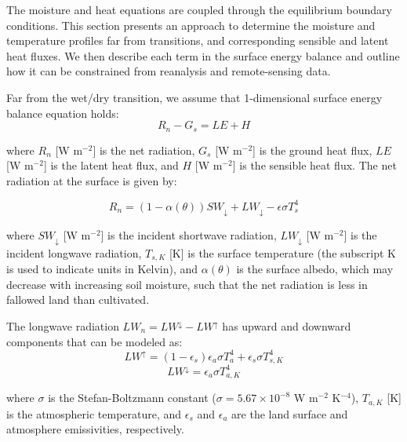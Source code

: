 \documentclass{article}
\begin{document}
    The moisture and heat equations are coupled through the equilibrium boundary conditions. 
     This section presents an approach to determine the moisture and temperature profiles far from transitions, and corresponding sensible and latent heat fluxes. 
    We then describe each term in the surface energy balance and outline how it can be constrained from reanalysis and remote-sensing data.
    
    Far from the wet/dry transition,
    we assume that 1-dimensional surface energy balance equation holds:
    \begin{equation}
    \label{eq:energy_upwind}
     R_n - G_s =  LE + H
    \end{equation}
     
     where $R_n$ [W m$^{-2}$] is the net radiation, $G_s$ [W m$^{-2}$] is the ground heat flux, $LE$ [W m$^{-2}$] is the latent heat flux, and $H$ [W m$^{-2}$] is the sensible heat flux.  
    The net radiation at the surface is given by:
    
    \begin{equation}
        R_n = (1- \alpha(\theta)) SW_{\downarrow} + LW_\downarrow - \epsilon \sigma T_s^4
    \end{equation}
    
    where $SW_\downarrow$ [W m$^{-2}$] is the incident shortwave radiation,  
    $LW_{\downarrow}$ [W m$^{-2}$] is the  incident longwave radiation,  
    $T_{s,K}$ [K] is the surface temperature (the subscript K is used to indicate units in Kelvin), and
    $\alpha(\theta)$ is the surface albedo, which may decrease with increasing soil moisture, such that the net radiation is less in fallowed land than cultivated.
    
    The longwave radiation $LW_n = LW^\downarrow - LW^\uparrow$ has  upward and downward  components that can be modeled as:
    \begin{equation}
    LW^\uparrow = (1 - \epsilon_s)\epsilon_a \sigma T_a^4 + \epsilon_s \sigma T_{s,K}^4   
    \label{eq:LW_up}
    \end{equation}
    \begin{equation}
    LW^\downarrow = \epsilon_a \sigma T_{a,K}^4    
    \label{eq:LW_down}
    \end{equation}
    
    where $\sigma$ is the Stefan-Boltzmann constant ($\sigma = 5.67 \times 10^{-8}$ W m$^{-2}$ K$^{-4}$),   $T_{a,K}$ [K]  is the atmospheric temperature, and $\epsilon_s$ and $\epsilon_a$ are the land surface and atmosphere emissivities, respectively. 
    
\end{document}

